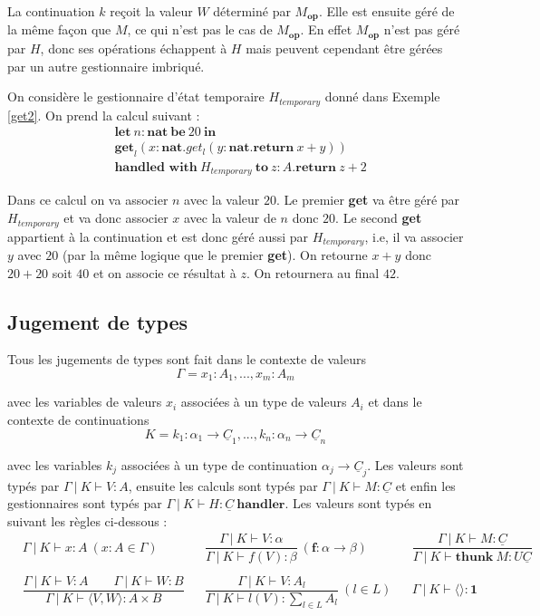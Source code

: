 	La continuation $k$ reçoit la valeur $W$ déterminé par $M_\textbf{op}$. Elle est ensuite géré de la même façon que $M$, ce qui n'est pas le cas de $M_\textbf{op}$. En effet $M_\textbf{op}$ n'est pas géré par $H$, donc ses opérations échappent à $H$ mais peuvent cependant être gérées par un autre gestionnaire imbriqué. 
	
	\begin{exemple}\label{get3}
		On considère le gestionnaire d'état temporaire $H_{temporary}$ donné dans Exemple \ref{get2}. On prend la calcul suivant :
		\begin{align*}
			& \textbf{let}~n:\textbf{nat}~\textbf{be}~20~\textbf{in}\\
			& \textbf{get}_l(x:\textbf{nat}.get_l(y:\textbf{nat}.\textbf{return}~x+y))\\
			&\textbf{handled~with}~H_{temporary}~\textbf{to}~z:A.\textbf{return}~z+2
		\end{align*}
	
	Dans ce calcul on va associer $n$ avec la valeur $20$. Le premier \textbf{get} va être géré par $H_{temporary}$ et va donc associer $x$ avec la valeur de $n$ donc $20$. Le second \textbf{get} appartient à la continuation et est donc géré aussi par $H_{temporary}$, i.e, il va associer $y$ avec $20$ (par la même logique que le premier \textbf{get}). On retourne $x + y$ donc $20 + 20$ soit $40$ et on associe ce résultat à $z$. On retournera au final $42$.
	\end{exemple}
	
\subsection{Jugement de types}

	Tous les jugements de types sont fait dans le contexte de valeurs
		\[\Gamma = x_1:A_1,...,x_m:A_m\]
		
	avec les variables de valeurs $x_i$ associées à un type de valeurs $A_i$ et dans le contexte de continuations
		\[K = k_1:\alpha_1 \rightarrow \underline{C}_1,...,k_n:\alpha_n \rightarrow \underline{C}_n\]
		
	avec les variables $k_j$ associées à un type de continuation $\alpha_j \rightarrow \underline{C}_j$. 
	\bigbreak
	Les valeurs sont typés par $\Gamma~|~K \vdash V:A$, ensuite les calculs sont typés par $\Gamma~|~K \vdash M:\underline{C}$ et enfin les gestionnaires sont typés par $\Gamma~|~K \vdash H:\underline{C}~\textbf{handler}$.
	\smallbreak 
	Les valeurs sont typés en suivant les règles ci-dessous : 
	\begin{align*}
		&\Gamma~|~K \vdash x:A~(x:A \in \Gamma) & &\dfrac{\Gamma~|~K \vdash V:\alpha}{\Gamma~|~K \vdash f(V):\beta}~(\textbf{f}:\alpha \rightarrow \beta) & &\dfrac{\Gamma~|~K \vdash M:\underline{C}}{\Gamma~|~K \vdash \textbf{thunk}~M:U\underline{C}}\\\\
		&\dfrac{\Gamma~|~K \vdash V:A\quad\quad\Gamma~|~K \vdash W:B}{\Gamma~|~K \vdash \langle V,W \rangle:A \times B} & &\dfrac{\Gamma~|~K \vdash V:A_l}{\Gamma~|~K \vdash l(V):\sum_{l \in L}A_l}~(l \in L) & &\Gamma~|~K \vdash \langle\rangle:\textbf{1}
	\end{align*}
	
